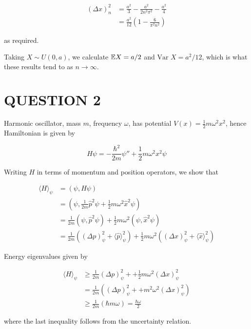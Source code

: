 \documentclass[a4paper]{article}
\begin{document}
\begin{align*}
(\Delta x)_{n}^{2} & = \frac{a^{2}}{3}  - \frac{a^{2}}{2 n^{2}\pi^{2}}  - \frac{a^{2}}{4} \\
& = \frac{a^{2}}{12} \left( 1 - \frac{6}{\pi^{2} n^{2}} \right) 
\end{align*}

as required.

Taking $ X \sim U(0,a) $, we calculate $ \mathbb{E} X = a/2 $ and $ \text{Var } X = a^{2} / 12 $, which is what these results tend to as $ n \to \infty $. 


\section{QUESTION 2}


Harmonic oscillator, mass $ m $, frequency $ \omega $, has potential $ V(x) = \frac{1}{2} m \omega^{2} x^{2} $, hence Hamiltonian is given by

\[ H \psi = - \frac{\hbar^{2}}{2m} \psi'' + \frac{1}{2} m \omega^{2} x^{2} \psi  \]

Writing $ H $ in terms of momentum and position operators, we show that

\begin{align*}
\langle H \rangle_{\psi} & = ( \psi, H \psi )  \\
& = ( \psi,  \frac{1}{2m} \hat{p}^{2} \psi + \frac{1}{2} m \omega^{2} \hat{x}^{2} \psi   ) \\
& = \frac{1}{2m} ( \psi, \hat{p}^{2} \psi) + \frac{1}{2} m \omega^{2} (\psi, \hat{x}^{2} \psi) \\
& = \frac{1}{2m} \left(  (\Delta p)_{\psi}^{2} + \langle \hat{p} \rangle_{\psi}^{2}  \right)  + \frac{1}{2} m \omega^{2} \left(  ( \Delta x)_{\psi}^{2} + \langle \hat{x} \rangle_{\psi}^{2}  \right)
\end{align*}

Energy eigenvalues given by


\begin{align*}
\langle H \rangle_{\psi} & \geq \frac{1}{2m} (\Delta p)_{\psi}^{2} +   + \frac{1}{2} m \omega^{2}( \Delta x)_{\psi}^{2} \\
& = \frac{1}{2m} \left( (\Delta p)_{\psi}^{2} +   + m^{2} \omega^{2}( \Delta x)_{\psi}^{2}  \right)  \\
& \geq  \frac{1}{2m} \left(  \hbar m \omega \right) = \frac{\hbar \omega}{2} 
\end{align*}

where the last inequality follows from the uncertainty relation.
\end{document}
